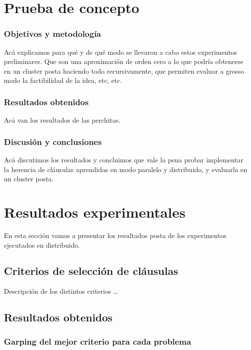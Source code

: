 \section{Prueba de concepto}

\subsubsection{Objetivos y metodología}

Acá explicamos para qué y de qué modo se llevaron a cabo estos experimentos preliminares. Que son una aproximación de orden cero a lo que podría obtenerse en un cluster posta haciendo todo recursivamente, que permiten evaluar a grosso modo la factibilidad de la idea, etc, etc.

\subsubsection{Resultados obtenidos}

Acá van los resultados de las perchitas.

\subsubsection{Discusión y conclusiones}

Acá discutimos los resultados y concluimos que vale la pena probar implementar la herencia de cláusulas aprendidas en modo paralelo y distribuido, y evaluarla en un cluster posta.


\section{Resultados experimentales}

En esta sección vamos a presentar los resultados posta de los experimentos ejecutados en distribuido.

\subsection{Criterios de selección de cláusulas}

Descripción de los distintos criterios \ldots

\subsection{Resultados obtenidos}

\subsubsection{Garping del mejor criterio para cada problema}

